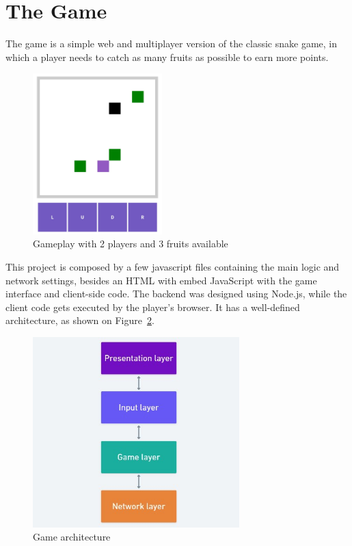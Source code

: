 \documentclass[english]{sbrt}
\begin{document}
\section{\textbf{The Game}}
The game is a simple web and multiplayer version of the classic snake game, in which a player needs to
catch as many fruits as possible to earn more points.

\begin{figure}[H]
  \centering
  \includegraphics[width=5cm]{game-screen.jpg}
  \caption{Gameplay with 2 players and 3 fruits available}
  \label{game-screen}
\end{figure}

This project is composed by a few javascript files containing the main logic and network settings, besides an HTML with embed JavaScript with the game interface and client-side code. The backend was designed using Node.js, while the client code gets executed by the player's browser. It has a well-defined architecture, as shown on Figure~\ref{game-layers}.

\begin{figure}[H]
  \centering
  \includegraphics[width=8cm]{game-layers.jpg}
  \caption{Game architecture}
  \label{game-layers}
\end{figure}
\end{document}
